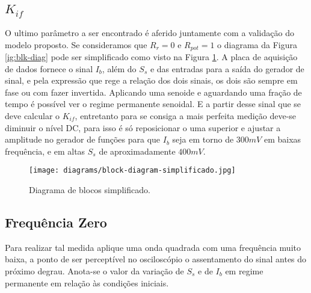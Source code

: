 \subsection{$K_{if}$}
O ultimo parâmetro a ser encontrado é aferido juntamente com a validação do modelo proposto. Se consideramos que $ R_r  = 0 $ e $ R_{pot} = 1 $ o diagrama da Figura \ref{ig:blk-diag} pode ser simplificado como visto na Figura \ref{fig:blk-diag-sim}.
A placa de aquisição de dados fornece o sinal $ I_b $, além do $ S_s $ e das entradas para a saída do gerador de sinal, e pela expressão que rege a relação dos dois sinais, os dois são sempre em fase ou com fazer invertida. Aplicando uma senoide e aguardando uma fração de tempo é possível ver o regime permanente senoidal. E a partir desse sinal que se deve calcular o $K_{if}$, entretanto para se consiga a mais perfeita medição deve-se diminuir o nível DC, para isso é só reposicionar o uma superior e ajustar a amplitude no gerador de funções para que $ I_b $ seja em torno de $ 300 mV $ em baixas frequência, e em altas $ S_s $ de aproximadamente $ 400 mV $.

\begin{figure}
\centering
\texttt{[image: diagrams/block-diagram-simplificado.jpg]}
\caption{Diagrama de blocos simplificado.}
\label{fig:blk-diag-sim}
\end{figure}

\subsection{Frequência Zero}
Para realizar tal medida aplique uma onda quadrada com uma frequência  muito baixa, a ponto de ser perceptível no osciloscópio o assentamento do sinal antes do próximo degrau. Anota-se o valor da variação de $S_s$ e de $I_b$ em regime permanente em relação às
condições iniciais.